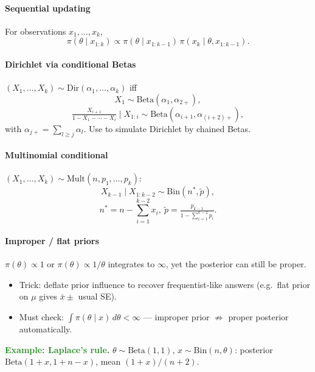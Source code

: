 \paragraph{Sequential updating}
For observations $x_1,\ldots,x_k$,
\[\pi(\theta\mid x_{1:k})\propto \pi(\theta\mid x_{1:k-1})\,\pi(x_k\mid\theta,x_{1:k-1}).\]

\paragraph{Dirichlet via conditional Betas}
$(X_1,\ldots,X_k)\sim\mathrm{Dir}(\alpha_1,\ldots,\alpha_k)$ iff
\[X_1\sim\mathrm{Beta}(\alpha_1,\alpha_{2+}),\]
\[\tfrac{X_{i+1}}{1-X_1-\cdots-X_i}\mid X_{1:i}\sim\mathrm{Beta}(\alpha_{i+1},\alpha_{(i+2)+}),\]
with $\alpha_{j+}=\sum_{l\ge j}\alpha_l$. \textcolor{Bittersweet}{Use} to simulate Dirichlet by chained Betas.

\paragraph{Multinomial conditional}
$(X_1,\ldots,X_k)\sim\mathrm{Mult}(n,p_1,\ldots,p_k)$:
\[X_{k-1}\mid X_{1:k-2}\sim\mathrm{Bin}(n^{*},\tilde p),\]
\[n^{*}=n-\!\!\sum_{i=1}^{k-2}\!x_i,\ \tilde p=\tfrac{p_{k-1}}{1-\sum_{i=1}^{k-2}p_i}.\]

\paragraph{Improper / flat priors}
$\pi(\theta)\propto 1$ or $\pi(\theta)\propto 1/\theta$ integrates to $\infty$, yet the posterior can still be proper.
\begin{itemize}
  \item \textcolor{Bittersweet}{Trick}: deflate prior influence to recover frequentist-like answers (e.g.\ flat prior on $\mu$ gives $\bar x\pm$ usual SE).
  \item \textcolor{Bittersweet}{Must check}: $\int \pi(\theta\mid x)\,d\theta<\infty$ — improper prior $\not\Rightarrow$ proper posterior automatically.
\end{itemize}

\textcolor{ForestGreen}{\textbf{Example: Laplace's rule.}} $\theta\sim\mathrm{Beta}(1,1)$, $x\sim\mathrm{Bin}(n,\theta)$: posterior $\mathrm{Beta}(1+x,1+n-x)$, mean $(1+x)/(n+2)$.
